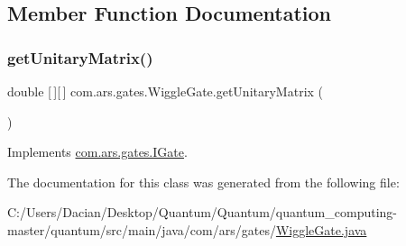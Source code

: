 \subsection{Member Function Documentation}
\hypertarget{classcom_1_1ars_1_1gates_1_1_wiggle_gate_a1007dd60c814cd64bb6abbd8c3b9e409}{}\label{classcom_1_1ars_1_1gates_1_1_wiggle_gate_a1007dd60c814cd64bb6abbd8c3b9e409} 
\subsubsection{\texorpdfstring{get\+Unitary\+Matrix()}{getUnitaryMatrix()}}
{\footnotesize\ttfamily double \mbox{[}$\,$\mbox{]}\mbox{[}$\,$\mbox{]} com.\+ars.\+gates.\+Wiggle\+Gate.\+get\+Unitary\+Matrix (\begin{DoxyParamCaption}{ }\end{DoxyParamCaption})}



Implements \hyperlink{interfacecom_1_1ars_1_1gates_1_1_i_gate_a6a940b3a6940cd97429aa211143121cb}{com.\+ars.\+gates.\+I\+Gate}.



The documentation for this class was generated from the following file\+:\begin{DoxyCompactItemize}
\item 
C\+:/\+Users/\+Dacian/\+Desktop/\+Quantum/\+Quantum/quantum\+\_\+computing-\/master/quantum/src/main/java/com/ars/gates/\hyperlink{_wiggle_gate_8java}{Wiggle\+Gate.\+java}\end{DoxyCompactItemize}
